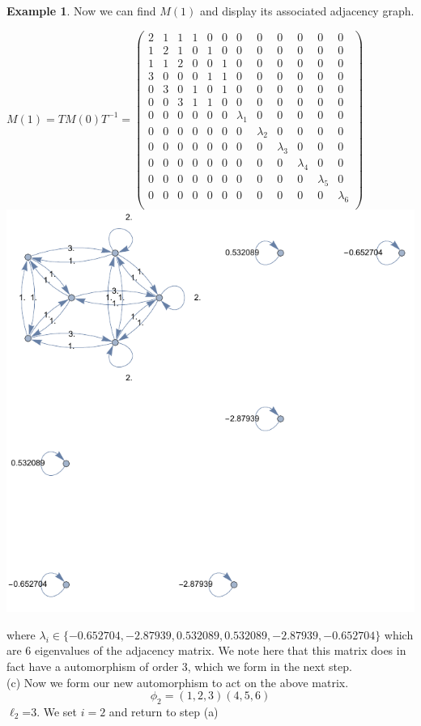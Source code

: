 \documentclass[preprint,12pt]{elsarticle}
\theoremstyle{definition}
\newtheorem{example}[thm]{Example}
\theoremstyle{remark}
\begin{document}
\begin{example}
Now we can find $M(1)$ and display its associated adjacency graph.
\begin{center}
$
M(1)=TM(0)T^{-1}=
\left(\begin{matrix}
2&1&1&1&0&0&0&0&0&0&0&0	\\
1&2&1&0&1&0&0&0&0&0&0&0 \\
1&1&2&0&0&1&0&0&0&0&0&0	\\
3&0&0&0&1&1&0&0&0&0&0&0	\\
0&3&0&1&0&1&0&0&0&0&0&0	\\
0&0&3&1&1&0&0&0&0&0&0&0	\\
0&0&0&0&0&0&\lambda_1&0&0&0&0&0\\
0&0&0&0&0&0&0&\lambda_2&0&0&0&0\\
0&0&0&0&0&0&0&0&\lambda_3&0&0&0\\
0&0&0&0&0&0&0&0&0&\lambda_4&0&0\\
0&0&0&0&0&0&0&0&0&0&\lambda_5&0\\
0&0&0&0&0&0&0&0&0&0&0&\lambda_6\\
\end{matrix}\right)
$
\includegraphics[scale=.8]{ex1_2}\\
\end{center}
where $\lambda_i\in\{-0.652704,-2.87939,0.532089,0.532089,-2.87939,-0.652704\}$ which are 6 eigenvalues of the adjacency matrix. We note here that this matrix does in fact have a automorphism of order 3, which we form in the next step.\\
(c) Now we form our new automorphism to act on the above matrix.
$$\phi_2=(1,2,3)(4,5,6)$$  $\ell_2$=3.  We set $i=2$ and return to step (a)
\\


\end{example}
\end{document}
